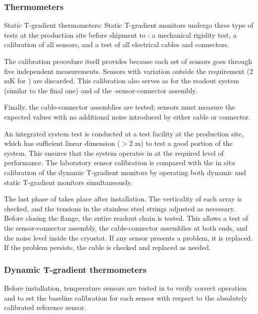 \subsubsection{Thermometers}

Static T-gradient thermometers: Static T-gradient monitors undergo
three type of tests at the production site before shipment to
: a mechanical rigidity test, a calibration of all
sensors, and a test of all electrical cables and connectors.

The calibration procedure itself provides  because each set
of sensors goes through five independent measurements. Sensors with
 variation outside the requirement (2 mK for ) are
discarded. This calibration also serves as  for the readout
system (similar to the final one) and of the -sensor-connector
assembly.

Finally, the cable-connector assemblies are tested; sensors must
measure the expected values with no additional noise introduced by
either cable or connector.

An integrated system test is conducted at a  test facility
at the production site, which has sufficient linear dimension ($>$2 m)
to test a good portion of the system. This ensures that the system
operates in  at the required level of performance. The
laboratory sensor calibration is compared with the in situ calibration
of the dynamic T-gradient monitors by operating both dynamic and
static T-gradient monitors simultaneously.

The last phase of  takes place after installation. The
verticality of each array is checked, and the tensions in the
stainless steel strings adjusted as necessary. Before closing the
flange, the entire readout chain is tested. This allows a test of the
sensor-connector assembly, the cable-connector assemblies at both
ends, and the noise level inside the cryostat. If any sensor presents
a problem, it is replaced. If the problem persists, the cable is
checked and replaced as needed.

\subsubsection{Dynamic T-gradient thermometers}

Before installation, temperature sensors are tested in  to
verify correct operation and to set the baseline calibration for each
sensor with respect to the absolutely calibrated reference sensor.

